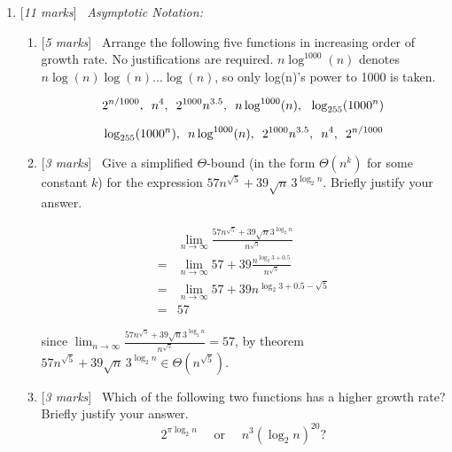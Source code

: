 \documentclass[11pt]{article}
\newcommand{\Q}[1]{\medskip\item {[{\em #1 marks\/}]}\ }
\begin{document}
\begin{enumerate}

\Q{11} {\em Asymptotic Notation:}  

\begin{enumerate}

\Q{5} Arrange the following five functions in increasing
order of growth rate. No justifications are required. $n\log^{1000}(n)$ denotes $n \log(n) \log(n) ... \log(n)$, 
so only log(n)'s power to 1000 is taken.

$$2^{n/1000}, \text{\hspace{5pt}} n^4, \text{\hspace{5pt}} 2^{1000}n^{3.5}, \text{\hspace{5pt}} n\log^{1000}(n), \text{\hspace{5pt}} \log_{255}(1000^n)$$

$$\log_{255}(1000^n),
\text{\hspace{5pt}} n\log^{1000}(n), 
\text{\hspace{5pt}} 2^{1000}n^{3.5}, 
\text{\hspace{5pt}} n^4, 
\text{\hspace{5pt}} 2^{n/1000}
$$

\newpage
\Q {3} 
Give a simplified $\Theta$-bound (in the form $\Theta(n^k)$ for some constant $k$) for the expression
$57 n^{\sqrt{5}} + 39 \sqrt{n} \, 3^{\log_2 n}$. Briefly justify your answer.

\begin{align*}
    & \lim_{n \to \infty} \frac {57 n^{\sqrt{5}} + 39 \sqrt{n} 3^{\log_2 n}} {n^{\sqrt{5}}}\\
    = & \lim_{n \to \infty} 57 + 39 \frac {n^{\log_2 3 + 0.5}} {n^{\sqrt{5}}}\\
    = & \lim_{n \to \infty} 57 + 39 n^{\log_2 3 + 0.5 - \sqrt{5}}\\
    = & 57
\end{align*}

since $\lim_{n \to \infty} \frac {57 n^{\sqrt{5}} + 39 \sqrt{n} 3^{\log_2 n}} {n^{\sqrt{5}}} = 57$,
by theorem $57 n^{\sqrt{5}} + 39 \sqrt{n} \, 3^{\log_2 n} \in \Theta(n^{\sqrt{5}})$.

\newpage
\Q {3} Which of the following two functions has a higher growth rate? Briefly justify your answer.
\[2^{\pi \log_2 n} \quad \mbox{ or } \quad n^3 (\log_2 n)^{20}?\]


\end{enumerate}
\end{enumerate}
\end{document}
